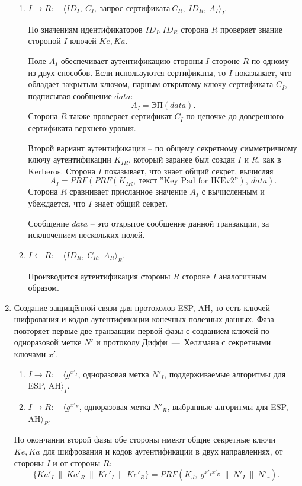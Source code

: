 \begin{enumerate}
\begin{enumerate}
            \item $I \rightarrow R$: ~ $\langle ID_I, ~ C_I, ~\text{запрос сертификата}~ C_R, ~ ID_R, ~ A_I \rangle_I$.

                По значениям идентификаторов $ID_I, ID_R$ сторона $R$ проверяет знание стороной $I$ ключей $Ke, Ka$.

                Поле $A_I$ обеспечивает аутентификацию стороны $I$ стороне $R$ по одному из двух способов. Если используются сертификаты, то $I$ показывает, что обладает закрытым ключом, парным открытому ключу сертификата $C_I$, подписывая сообщение $data$:
                    \[ A_I = \textrm{ЭП}(data). \]
                Сторона $R$ также проверяет сертификат $C_I$ по цепочке до доверенного сертификата верхнего уровня.

                Второй вариант аутентификации  -- по общему секретному симметричному ключу аутентификации $K_{IR}$, который заранее был создан $I$ и $R$, как в Kerberos. Сторона $I$ показывает, что знает общий секрет, вычисляя
                    \[ A_I = PRF( PRF(K_{IR}, ~ \text{текст ''Key Pad for IKEv2''}), ~ data). \]
                Сторона $R$ сравнивает присланное значение $A_I$ с вычисленным и убеждается, что $I$ знает общий секрет.

                Сообщение $data$ -- это открытое сообщение данной транзакции, за исключением нескольких полей.

            \item $I \leftarrow R$: ~ $\langle ID_R, ~ C_R, ~ A_R \rangle_R$.

                Производится аутентификация стороны $R$ стороне $I$ аналогичным образом.
        \end{enumerate}

    \item Создание защищённой связи для протоколов ESP, AH, то есть ключей шифрования и кодов аутентификации конечных полезных данных. Фаза повторяет первые две транзакции первой фазы с созданием ключей по одноразовой метке $N'$ и протоколу Диффи~---~Хеллмана с секретными ключами $x'$.
        \begin{enumerate}
            \item $I \rightarrow R$: ~ $\langle g^{x'_I}$, одноразовая метка $N'_I$, поддерживаемые алгоритмы для ESP, AH$\rangle_I$.
            \item $I \rightarrow R$: ~ $\langle g^{x'_R}$, одноразовая метка $N'_R$, выбранные алгоритмы для ESP, AH$\rangle_R$.
        \end{enumerate}
        По окончании второй фазы обе стороны имеют общие секретные ключи $Ke, Ka$ для шифрования и кодов аутентификации в двух направлениях, от стороны $I$ и от стороны $R$:
            \[ \{Ka'_I ~\|~ Ka'_R ~\|~ Ke'_I ~\|~ Ke'_R \} = PRF(K_d, ~ g^{x'_I x'_R} ~\|~ N'_I ~\|~ N'_r). \]
\end{enumerate}

